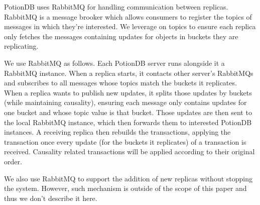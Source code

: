 \documentclass{vldb}
\begin{document}
PotionDB uses RabbitMQ \cite{???} for handling communication between replicas.
RabbitMQ is a message brooker which allows consumers to register the topics of messages in which they're interested.
We leverage on topics to ensure each replica only fetches the messages containing updates for objects in buckets they are replicating.

We use RabbitMQ as follows.
Each PotionDB server runs alongside it a RabbitMQ instance.
When a replica starts, it contacts other server's RabbitMQs and subscribes to all messages whose topics match the buckets it replicates.
When a replica wants to publish new updates, it splits those updates by buckets (while maintaining causality), ensuring each message only contains updates for one bucket and whose topic value is that bucket.
Those updates are then sent to the local RabbitMQ instance, which then forwards them to interested PotionDB instances.
A receiving replica then rebuilds the transactions, applying the transaction once every update (for the buckets it replicates) of a transaction is received.
Causality related transactions will be applied according to their original order.

We also use RabbitMQ to support the addition of new replicas without stopping the system.
However, such mechanism is outside of the scope of this paper and thus we don't describe it here.
\end{document}
